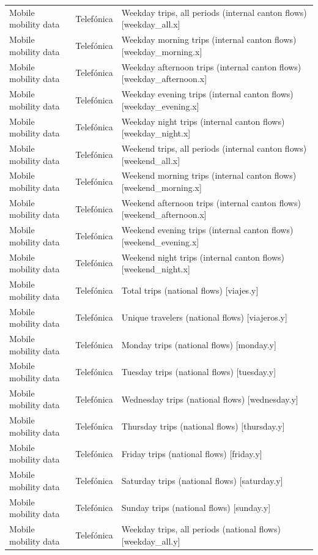 \begin{landscape}
\begin{longtable}[t]{>{\raggedright\arraybackslash}p{3.4cm}>{\raggedright\arraybackslash}p{5.6cm}>{\raggedright\arraybackslash}p{12.4cm}}
Mobile mobility data & Telefónica & Weekday trips, all periods (internal canton flows) [weekday\_all.x]\\
Mobile mobility data & Telefónica & Weekday morning trips (internal canton flows) [weekday\_morning.x]\\
Mobile mobility data & Telefónica & Weekday afternoon trips (internal canton flows) [weekday\_afternoon.x]\\
Mobile mobility data & Telefónica & Weekday evening trips (internal canton flows) [weekday\_evening.x]\\
Mobile mobility data & Telefónica & Weekday night trips (internal canton flows) [weekday\_night.x]\\
Mobile mobility data & Telefónica & Weekend trips, all periods (internal canton flows) [weekend\_all.x]\\
Mobile mobility data & Telefónica & Weekend morning trips (internal canton flows) [weekend\_morning.x]\\
Mobile mobility data & Telefónica & Weekend afternoon trips (internal canton flows) [weekend\_afternoon.x]\\
Mobile mobility data & Telefónica & Weekend evening trips (internal canton flows) [weekend\_evening.x]\\
Mobile mobility data & Telefónica & Weekend night trips (internal canton flows) [weekend\_night.x]\\
Mobile mobility data & Telefónica & Total trips (national flows) [viajes.y]\\
Mobile mobility data & Telefónica & Unique travelers (national flows) [viajeros.y]\\
Mobile mobility data & Telefónica & Monday trips (national flows) [monday.y]\\
Mobile mobility data & Telefónica & Tuesday trips (national flows) [tuesday.y]\\
Mobile mobility data & Telefónica & Wednesday trips (national flows) [wednesday.y]\\
Mobile mobility data & Telefónica & Thursday trips (national flows) [thursday.y]\\
Mobile mobility data & Telefónica & Friday trips (national flows) [friday.y]\\
Mobile mobility data & Telefónica & Saturday trips (national flows) [saturday.y]\\
Mobile mobility data & Telefónica & Sunday trips (national flows) [sunday.y]\\
Mobile mobility data & Telefónica & Weekday trips, all periods (national flows) [weekday\_all.y]\\

\end{longtable}
\end{landscape}
